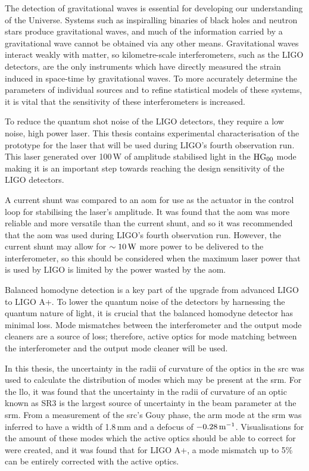 The detection of gravitational waves is essential for developing our understanding of the Universe. Systems such as inspiralling binaries of black holes and neutron stars produce gravitational waves, and much of the information carried by a gravitational wave cannot be obtained via any other means. Gravitational waves interact weakly with matter, so kilometre-scale interferometers, such as the LIGO detectors, are the only instruments which have directly measured the strain induced in space-time by gravitational waves. To more accurately determine the parameters of individual sources and to refine statistical models of these systems, it is vital that the sensitivity of these interferometers is increased.
\par
To reduce the quantum shot noise of the LIGO detectors, they require a low noise, high power laser. This thesis contains experimental characterisation of the prototype for the laser that will be used during LIGO's fourth observation run. This laser generated over 100\,W of amplitude stabilised light in the $\rm{HG_{00}}$ mode making it is an important step towards reaching the design sensitivity of the LIGO detectors. 
\par
A current shunt was compared to an \gls{aom} for use as the actuator in the control loop for stabilising the laser's amplitude. It was found that the \gls{aom} was more reliable and more versatile than the current shunt, and so it was recommended that the \gls{aom} was used during LIGO's fourth observation run. However, the current shunt may allow for $\sim10\,\rm{W}$ more power to be delivered to the interferometer, so this should be considered when the maximum laser power that is used by LIGO is limited by the power wasted by the \gls{aom}.
\par
Balanced homodyne detection is a key part of the upgrade from advanced LIGO to LIGO A+. To lower the quantum noise of the detectors by harnessing the quantum nature of light, it is crucial that the balanced homodyne detector has minimal loss. Mode mismatches between the interferometer and the output mode cleaners are a source of loss; therefore, active optics for mode matching between the interferometer and the output mode cleaner will be used. 
\par
In this thesis, the uncertainty in the radii of curvature of the optics in the \gls{src} was used to calculate the distribution of modes which may be present at the \gls{srm}. For the \gls{llo}, it was found that the uncertainty in the radii of curvature of an optic known as SR3 is the largest source of uncertainty in the beam parameter at the \gls{srm}. From a measurement of the \gls{src}'s Gouy phase, the arm mode at the \gls{srm} was inferred to have a width of 1.8\,mm and a defocus of $-0.28\,\rm{m^{-1}}$. Visualisations for the amount of these modes which the active optics should be able to correct for were created, and it was found that for LIGO A+, a mode mismatch up to 5\% can be entirely corrected with the active optics.
